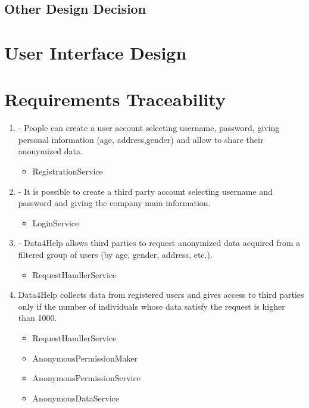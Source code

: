 \documentclass[a4paper]{article}
\begin{document}
\subsection{Other Design Decision}
\clearpage

\section{User Interface Design}
\clearpage

\section{Requirements Traceability}

\begin{enumerate}[label*=\bf{R.\arabic*}]

\item - People can create a user account selecting username, password,
giving personal information (age, address,gender) and allow to
share their anonymized data.

\begin{itemize}
\item RegistrationService
\end{itemize}

\item - It is possible to create a third party account selecting username
and password and giving the company main information.

\begin{itemize}
\item LoginService
\end{itemize}

\item - Data4Help allows third parties to request anonymized data acquired
from a filtered group of users (by age, gender, address, etc.).

\begin{itemize}
\item RequestHandlerService
\end{itemize}

\item Data4Help collects data from registered users and gives access to
third parties only if the number of individuals whose data satisfy the
request is higher than 1000.

\begin{itemize}
\item RequestHandlerService
\item AnonymousPermissionMaker
\item AnonymousPermissionService
\item AnonymousDataService
\end{itemize}


\end{enumerate}
\end{document}
